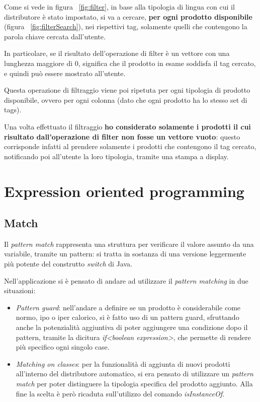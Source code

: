 Come si vede in figura ~\ref{fig:filter}, in base alla tipologia di lingua con cui il distributore è stato impostato, si va a cercare, \textbf{per ogni prodotto disponibile} (figura ~\ref{fig:filterSearch}), nei rispettivi tag, solamente quelli che contengono la parola chiave cercata dall'utente.

In particolare, se il risultato dell'operazione di filter è un vettore con una lunghezza maggiore di 0, significa che il prodotto in esame soddisfa il tag cercato, e quindi può essere mostrato all'utente. 

Questa operazione di filtraggio viene poi ripetuta per ogni tipologia di prodotto disponibile, ovvero per ogni colonna (dato che ogni prodotto ha lo stesso set di tags).

Una volta effettuato il filtraggio \textbf{ho considerato solamente i prodotti il cui risultato dall'operazione di filter non fosse un vettore vuoto}: questo corrisponde infatti al prendere solamente i prodotti che contengono il tag cercato, notificando poi all'utente la loro tipologia, tramite una stampa a display.

\section{Expression oriented programming}
\label{sec:match_sealed}
\subsection{Match}
Il \textit{pattern match} rappresenta una struttura per verificare il valore assunto da una variabile, tramite un pattern: si tratta in sostanza di una versione leggermente più potente del construtto \textit{switch} di Java.

Nell'applicazione si è pensato di andare ad utilizzare il \textit{pattern matching} in due situazioni:
\begin{itemize}
	\item \textit{Pattern guard}: nell'andare a definire se un prodotto è considerabile come normo, ipo o iper calorico, si è fatto uso di un pattern guard, sfruttando anche la potenzialità aggiuntiva di poter aggiungere una condizione dopo il pattern, tramite la dicitura \textit{if<boolean expression>}, che permette di rendere più specifico ogni singolo case.
	\item \textit{Matching on classes}: per la funzionalità di aggiunta di nuovi prodotti all'interno del distributore automatico, si era pensato di utilizzare un \textit{pattern match} per poter distinguere la tipologia specifica del prodotto aggiunto. Alla fine la scelta è però ricaduta sull'utilizzo del comando \textit{isInstanceOf}.
\end{itemize}

